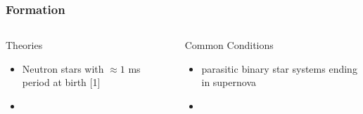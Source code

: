 \documentclass[hyperref=pdftex, presentation]{beamer}
\begin{document}
\begin{frame}{}
\frametitle{\Large Formation}
\begin{columns}[c] %

\begin{block}{Theories}
\begin{itemize}
 \item<2-> Neutron stars with $\approx 1$ ms period at birth [1]%
 \item<4-> 
\end{itemize}
\end{block}
\begin{block}{Common Conditions}
\begin{itemize}
	\item<3-> parasitic binary star systems ending in supernova %
	\item<5-> 
\end{itemize}
\end{block}


\end{columns}
\end{frame}






\end{document}
